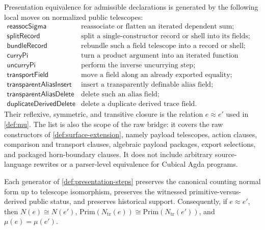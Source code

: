 \documentclass{lmcs}
\newcommand{\Prim}{\mathrm{Prim}}
\begin{document}
\begin{defi}
\label{def:presentation-steps}
Presentation equivalence for admissible declarations is generated by the following local moves on normalized public telescopes:
\[
\begin{array}{ll}
  \mathsf{reassocSigma}              & \text{reassociate or flatten an iterated dependent sum;}\\
  \mathsf{splitRecord}               & \text{split a single-constructor record or shell into its fields;}\\
  \mathsf{bundleRecord}              & \text{rebundle such a field telescope into a record or shell;}\\
  \mathsf{curryPi}                   & \text{turn a product argument into an iterated function telescope;}\\
  \mathsf{uncurryPi}                 & \text{perform the inverse uncurrying step;}\\
  \mathsf{transportField}            & \text{move a field along an already exported equality;}\\
  \mathsf{transparentAliasInsert}    & \text{insert a transparently definable alias field;}\\
  \mathsf{transparentAliasDelete}    & \text{delete such an alias field;}\\
  \mathsf{duplicateDerivedDelete}    & \text{delete a duplicate derived trace field.}
\end{array}
\]
Their reflexive, symmetric, and transitive closure is the relation $e\approx e'$ used in \autoref{def:mu}. The list is also the scope of the raw bridge: it covers the raw constructors of \autoref{def:surface-extension}, namely payload telescopes, action clauses, comparison and transport clauses, algebraic payload packages, export selections, and packaged horn-boundary clauses. It does not include arbitrary source-language rewrites or a parser-level equivalence for Cubical Agda programs.
\end{defi}

\begin{prop}
\label{prop:normal-form-stability}
Each generator of \autoref{def:presentation-steps} preserves the canonical counting normal form up to telescope isomorphism, preserves the witnessed primitive-versus-derived public status, and preserves historical support. Consequently, if $e\approx e'$, then $N(e)\cong N(e')$, $\Prim(N_{\mathrm{tr}}(e))\cong \Prim(N_{\mathrm{tr}}(e'))$, and $\mu(e)=\mu(e')$.
\end{prop}
\end{document}
